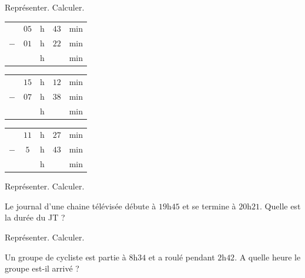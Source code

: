 \begin{pageAD}
\begin{ExoCad}{Représenter. Calculer.}
 
 \begin{minipage}{0.30\linewidth}
\begin{tabular}{ccccc} 
& $05$ & h &  $43$ & min \\ 
$-$   & $01$ & h & $22$ & min\\ 
\hline 
   &  & h & & min\\
\end{tabular} 
\end{minipage}
\hfill 
\begin{minipage}{0.30\linewidth}
 \begin{tabular}{ccccc} 
& $15$ & h &  $12$ & min \\ 
$-$   & $07$ & h &  $38$ & min\\ 
\hline 
   &  & h & & min\\
\end{tabular} 
\end{minipage}
\hfill 
\begin{minipage}{0.30\linewidth}
 \begin{tabular}{ccccc} 
& $11$ & h & $27$  & min \\ 
$-$   & $5$ & h & $43$ & min\\ 
\hline 
   &  & h & & min\\
\end{tabular} 
\end{minipage}
 
\end{ExoCad}



\begin{minipage}{0.49\linewidth}

\begin{ExoCad}{Représenter. Calculer.}

Le journal d'une chaine télévisée débute à $19$h$45$ et se termine à $20$h$21$. Quelle est la durée du JT ?
 \end{ExoCad}
\end{minipage}
\hfill 
 \begin{minipage}{0.49\linewidth}
\begin{ExoCad}{Représenter. Calculer.}

Un groupe de cycliste est partie à $8$h$34$ et a roulé pendant $2$h$42$. A quelle heure le groupe est-il arrivé  ?
\end{ExoCad}
\end{minipage}

 



\end{pageAD}
